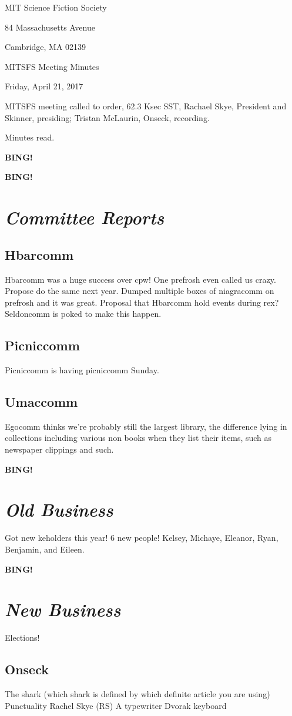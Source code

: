 \documentclass[10pt]{article}
\newcommand{\bing}{{\bf BING!} }
\newcommand{\goto}[1]{\bing \vskip 12pt \section*{{\em{#1}}}}
\newcommand{\skinner}{Rachael Skye, President and Skinner}
\newcommand{\onseck}{Tristan McLaurin, Onseck}
\newcommand{\meetingdate}{Friday, April 21, 2017}
\begin{document}
\begin{center}

MIT Science Fiction Society

84 Massachusetts Avenue

Cambridge, MA 02139

\vspace{12pt}

MITSFS Meeting Minutes

\meetingdate

\end{center}

\vspace{18pt}

\setlength{\parskip}{6pt}

\noindent
MITSFS meeting called to order, 62.3 Ksec SST,
\skinner, presiding; \onseck, recording.

Minutes read.

\bing

\goto{Committee Reports}
\subsection*{Hbarcomm}
Hbarcomm was a huge success over cpw! One prefrosh even called us crazy. Propose do the same next year. Dumped multiple boxes of niagracomm on prefrosh and it was great.
Proposal that Hbarcomm hold events during rex? Seldoncomm is poked to make this happen. 

\subsection*{Picniccomm}
Picniccomm is having picniccomm Sunday.

\subsection*{Umaccomm}
Egocomm thinks we're probably still the largest library, the difference lying in collections including various non books when they list their items, such as newspaper clippings and such. 


\goto{Old Business}
Got new keholders this year! 6 new people! Kelsey, Michaye, Eleanor, Ryan, Benjamin, and Eileen.

\goto{New Business}
Elections!

\subsection*{Onseck}
The shark (which shark is defined by which definite article you are using)
Punctuality
Rachel Skye (RS)
A typewriter
Dvorak keyboard
\end{document}
